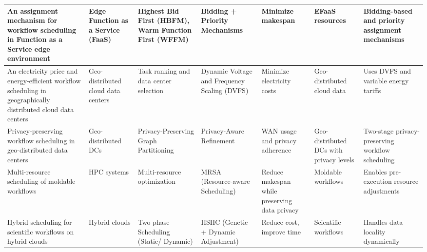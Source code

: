 \documentclass[a4paper, final]{article}
\begin{document}
\begin{table}[H]
\begin{tabularx}{\textwidth}{|p{3.5cm}|X|X|p{2cm}|X|X|X|}
    An assignment mechanism for workflow scheduling in Function as a Service edge environment \cite{bib:4_faas} &
    Edge Function as a Service (FaaS) &
    Highest Bid First (HBFM), Warm Function First (WFFM) &
    Bidding + Priority Mechanisms &
    Minimize makespan &
    EFaaS resources &
    Bidding-based and priority assignment mechanisms \\
    \hline

    An electricity price and energy-efficient workflow scheduling in geographically distributed cloud data centers \cite{bib:5_epee} &
    Geo-distributed cloud data centers &
    Task ranking and data center selection &
    Dynamic Voltage and Frequency Scaling (DVFS) &
    Minimize electricity costs &
    Geo-distributed cloud data &
    Uses DVFS and variable energy tariffs \\
    \hline

    Privacy-preserving workflow scheduling in geo-distributed data centers \cite{bib:7_ppps} &
    Geo-distributed DCs &
    Privacy-Preserving Graph Partitioning &
    Privacy-Aware Refinement &
    WAN usage and privacy adherence &
    Geo-distributed DCs with privacy levels &
    Two-stage privacy-preserving workflow scheduling \\
    \hline

    Multi-resource scheduling of moldable workflows \cite{bib:8} &
    HPC systems &
    Multi-resource optimization &
    MRSA (Resource-aware Scheduling) &
    Reduce makespan while preserving data privacy &
    Moldable workflows &
    Enables pre-execution resource adjustments \\
    \hline


    Hybrid scheduling for scientific workflows on hybrid clouds \cite{bib:9} &
    Hybrid clouds &
    Two-phase Scheduling (Static/ Dynamic) &
    HSHC (Genetic + Dynamic Adjustment) &
    Reduce cost, improve time &
    Scientific workflows &
    Handles data locality dynamically \\
    \hline


\end{tabularx}
\end{table}
\end{document}

